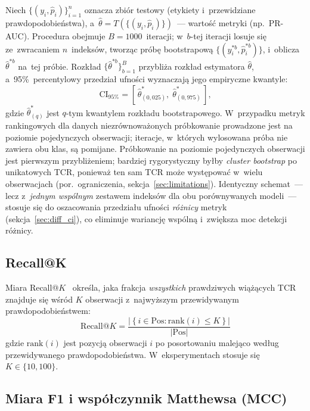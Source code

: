 \documentclass{SGGW-thesis}
\begin{document}
Niech $\{(y_i, \hat{p}_i)\}_{i=1}^{n}$ oznacza zbiór testowy (etykiety i~przewidziane
prawdopodobieństwa), a~$\hat{\theta} = T(\{(y_i, \hat{p}_i)\})$~--- wartość metryki (np.\ PR-AUC).
Procedura obejmuje $B = 1000$~iteracji; w~$b$-tej iteracji losuje się ze~zwracaniem $n$~indeksów,
tworząc próbę bootstrapową $\{(y_i^{*b}, \hat{p}_i^{*b})\}$, i~oblicza $\hat{\theta}^{*b}$ na~tej
próbie. Rozkład $\{\hat{\theta}^{*b}\}_{b=1}^{B}$ przybliża rozkład estymatora $\hat{\theta}$,
a~95\%~percentylowy przedział ufności wyznaczają jego empiryczne kwantyle:
\begin{equation}
    \mathrm{CI}_{95\%} = \left[\,\hat{\theta}^{*}_{(0{,}025)},\; \hat{\theta}^{*}_{(0{,}975)}\,\right],
    \label{eq:boot_ci}
\end{equation}
gdzie $\hat{\theta}^{*}_{(q)}$ jest $q$-tym kwantylem rozkładu bootstrapowego. W~przypadku
metryk rankingowych dla danych niezrównoważonych próbkowanie prowadzone jest na poziomie
pojedynczych obserwacji; iteracje, w~których wylosowana próba nie zawiera obu klas, są pomijane.
Próbkowanie na poziomie pojedynczych obserwacji jest pierwszym przybliżeniem; bardziej
rygorystyczny byłby \emph{cluster bootstrap} po unikatowych TCR, ponieważ ten sam TCR może
występować w~wielu obserwacjach (por.\ ograniczenia, sekcja~\ref{sec:limitations}).
Identyczny schemat~--- lecz z~\textit{jednym wspólnym} zestawem indeksów dla obu porównywanych
modeli~--- stosuje się do oszacowania przedziału ufności \textit{różnicy} metryk
(sekcja~\ref{sec:diff_ci}), co eliminuje wariancję wspólną i~zwiększa moc detekcji różnicy.

\subsection{Recall@K}

Miara Recall@$K$~\cite{manning2008} określa, jaka frakcja \emph{wszystkich} prawdziwych wiążących TCR znajduje się wśród $K$ obserwacji
z~najwyższym przewidywanym prawdopodobieństwem:
\begin{equation}
    \mathrm{Recall}@K = \frac{\left|\left\{i \in \mathrm{Pos} : \mathrm{rank}(i) \leq K\right\}\right|}{|\mathrm{Pos}|}
    \label{eq:hitsk}
\end{equation}
gdzie $\mathrm{rank}(i)$ jest pozycją obserwacji $i$ po posortowaniu malejąco według przewidywanego
prawdopodobieństwa. W~eksperymentach stosuje się $K \in \{10, 100\}$.

\subsection{Miara F1 i współczynnik Matthewsa (MCC)}
\end{document}
